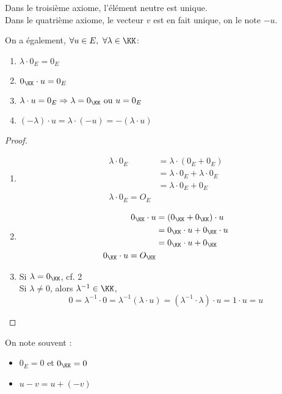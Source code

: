 \documentclass[../main.tex]{subfile}
\begin{document}
\begin{rema}
	Dans le troisième axiome, l'élément neutre est unique.\\
	Dans le quatrième axiome, le vecteur $v$ est en fait unique, on le note $-u$.
\end{rema}

\begin{prop}
	On a également, $\forall u \in E, \ \forall \lambda \in \KK$:
\begin{enumerate}
	\item $\lambda \cdot 0_E = 0_E$
	\item $0_{\KK} \cdot u = 0_E$
	\item $\lambda \cdot u = 0_E \Rightarrow \lambda = 0_\KK \ \text{ou} \ u = 0_E$
	\item $(-\lambda) \cdot u = \lambda \cdot (-u) = - (\lambda \cdot u)$
\end{enumerate}
\end{prop}

\begin{proof}
\begin{enumerate}
	\item 
$$
\begin{aligned}
	\lambda \cdot 0_E &= \lambda \cdot (0_E + 0_E)\\
	&= \lambda \cdot 0_E + \lambda \cdot 0_E\\
	&= \lambda \cdot 0_E + 0_E\\
	\lambda \cdot 0_E = O_E
\end{aligned}
$$
\item 
$$
\begin{aligned}
	0_\KK \cdot u &=   (0_\KK + 0_\KK) \cdot u\\
	&= 0_\KK \cdot u + 0_\KK \cdot u\\
	&= 0_\KK \cdot u + 0_\KK\\
	0_\KK \cdot u = O_\KK
\end{aligned}
$$
\item Si $\lambda = 0_\KK$, cf. 2\\
Si $\lambda \neq 0$, alors $\lambda^{-1} \in \KK$,\\
$$0 = \lambda^{-1} \cdot 0 = \lambda^{-1} (\lambda \cdot u) = (\lambda^{-1} \cdot \lambda) \cdot u = 1 \cdot u = u$$
\end{enumerate}
\end{proof}

\begin{nota}
	On note souvent :
\begin{itemize}
	\item $0_E = 0$ et $0_\KK = 0$
	\item $u - v = u + (-v)$
\end{itemize}
\end{nota}
\end{document}
